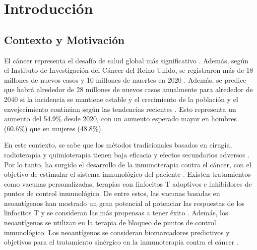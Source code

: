 \chapter{Introducción}
\label{cap:introduccion}


\section{Contexto y Motivación}
\label{sec:motivacion}

El cáncer representa el desafío de salud global más significativo \citep{siegel2023cancer}. Además, según el Instituto de Investigación del Cáncer del Reino Unido, se registraron más de 18 millones de nuevos casos y 10 millones de muertes en 2020 \citep{cancerUK2023}. Además, se predice que habrá alrededor de 28 millones de nuevos casos anualmente para alrededor de 2040 si la incidencia se mantiene estable y el crecimiento de la población y el envejecimiento continúan según las tendencias recientes \citep{cancerUK2023_2}. Esto representa un aumento del 54.9\% desde 2020, con un aumento esperado mayor en hombres (60.6\%) que en mujeres (48.8\%).

En este contexto, se sabe que los métodos tradicionales basados en cirugía, radioterapia y quimioterapia tienen baja eficacia y efectos secundarios adversos \citep{peng2019neoantigen}. Por lo tanto, ha surgido el desarrollo de la inmunoterapia contra el cáncer, con el objetivo de estimular el sistema inmunológico del paciente \citep{borden2022cancer}. Existen tratamientos como vacunas personalizadas, terapias con linfocitos T adoptivos e inhibidores de puntos de control inmunológico. De entre estos, las vacunas basadas en neoantígenos han mostrado un gran potencial al potenciar las respuestas de los linfocitos T y se consideran las más propensas a tener éxito \citep{borden2022cancer}. Además, los neoantígenos se utilizan en la terapia de bloqueo de puntos de control inmunológico. Los neoantígenos se consideran biomarcadores predictivos y objetivos para el tratamiento sinérgico en la inmunoterapia contra el cáncer \citep{fang2022neoantigens}.

